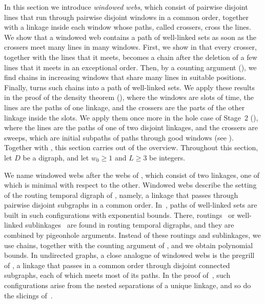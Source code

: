 \documentclass[fontsize=12pt,leading=14pt]{fullpaper}
\newcounter{step}
\begin{document}
In this section we introduce \emph{windowed webs}, which consist of pairwise disjoint lines that run through pairwise disjoint windows in a common order, together with a linkage inside each window whose paths, called crossers, cross the lines.
We show that a windowed web contains a path of well-linked sets as soon as the crossers meet many lines in many windows.
First, we show in  that every crosser, together with the lines that it meets, becomes a chain after the deletion of a few lines that it meets in an exceptional order.
Then, by a counting argument (), we find chains in increasing windows that share many lines in suitable positions.
Finally,  turns such chains into a path of well-linked sets.
We apply these results in the proof of the density theorem (), where the windows are slots of time, the lines are the paths of one linkage, and the crossers are the parts of the other linkage inside the slots.
We apply them once more in the hole case of Stage~2 (), where the lines are the paths of one of two disjoint linkages, and the crossers are sweeps, which are initial subpaths of paths through good windows (see ).
Together with , this section carries out  of the overview.
Throughout this section, let $D$ be a digraph, and let $w_0\ge1$ and $L\ge3$ be integers.

We name windowed webs after the webs of \textcite[Definition~4.1]{KawarabayashiK15}, which consist of two linkages, one of which is minimal with respect to the other.
Windowed webs describe the setting of the routing temporal digraph of \textcite[Definition~6.3]{HKMM26a}, namely, a linkage that passes through pairwise disjoint subgraphs in a common order.
In~\cite[Section~9]{HKMM26a}, paths of well-linked sets are built in such configurations with exponential bounds.
There, routings~\cite[Theorem~6.16]{HKMM26a} or well-linked sublinkages~\cite[Proposition~6.24]{HKMM26a} are found in routing temporal digraphs, and they are combined by pigeonhole arguments.
Instead of these routings and sublinkages, we use chains, together with the counting argument of , and we obtain polynomial bounds.
In undirected graphs, a close analogue of windowed webs is the pregrill of \textcite[Section~2]{LeafS15}, a linkage that passes in a common order through disjoint connected subgraphs, each of which meets most of its paths.
In the proof of~\cite[(3.1)]{LeafS15}, such configurations arise from the nested separations of a unique linkage, and so do the slicings of~\cite[Theorem~4.5]{CT21}.
\end{document}
